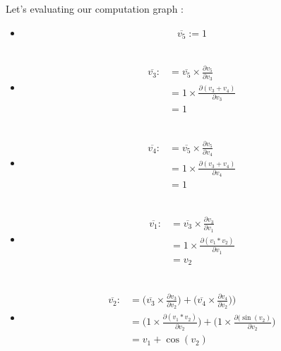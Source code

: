 \documentclass[12pt]{article}
\begin{document}
\bigskip

Let's evaluating our computation graph :

\begin{itemize}
    \item[]
$$\overline{v_5} := 1$$ \\

    \item[] 
\begin{equation*}
\begin{split}
    \overline{v_3} :&= \overline{v_5} \times \frac{\partial{v_5}}{\partial{v_3}} \\
    &= 1 \times \frac{\partial{(v_3+v_4)}}{\partial{v_3}} \\
    &= 1
\end{split}
\end{equation*} \\

    \item[]
\begin{equation*}
\begin{split}
    \overline{v_4} :&= \overline{v_5} \times \frac{\partial{v_5}}{\partial{v_4}}  \\
    &= 1 \times \frac{\partial{(v_3+v_4)}}{\partial{v_4}} \\
    &= 1
\end{split}
\end{equation*} \\

    \item[]
\begin{equation*}
\begin{split}
    \overline{v_1} :&= \overline{v_3} \times \frac{\partial{v_3}}{\partial{v_1}} \\
    &= 1 \times \frac{\partial{(v_1*v_2)}}{\partial{v_1}} \\
    &= v_2
\end{split}
\end{equation*} \\

    \item[]
\begin{equation*}
\begin{split}
    \overline{v_2} :&= \big( \overline{v_3} \times \frac{\partial{v_3}}{\partial{v_2}} \big) + \big( \overline{v_4} \times \frac{\partial{v_4}}{\partial{v_2}} \big) \big) \\
    &= \big( 1 \times \frac{\partial{(v_1*v_2)}}{\partial{v_2}} \big) + \big( 1 \times \frac{\partial{(\sin(v_2)}}{\partial{v_2}} \big) \\
    &= v_1 + \cos(v_2)
\end{split}
\end{equation*} \\
\end{itemize}
\end{document}
